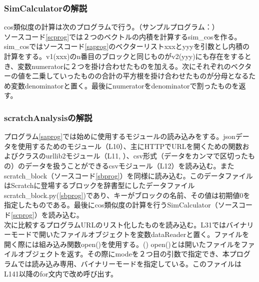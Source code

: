 \documentclass[a4paper,10pt,onecolumn,oneside,openany]{jsbook}
\begin{document}
\subsubsection{SimCalculatorの解説}
cos類似度の計算は次のプログラムで行う。（サンプルプログラム：\cite{simcalc}）
\\
ソースコード\ref{scprog}では２つのベクトルの内積を計算するsim\_cosを作る。
\\
sim\_cosではソースコード\ref{saprog}のベクターリストxxxとyyyを引数とし内積の計算をする。v1(xxx)のn番目のブロックと同じものがv2(yyy)にも存在をするとき、変数numeratorに２つを掛け合わせたものを加える。次にそれぞれのベクターの値を二乗していったものの合計の平方根を掛け合わせたものが分母となるため変数denominatorと置く。最後にnumeratorをdenominatorで割ったものを返す。

\subsubsection{scratchAnalysisの解説}
プログラム\ref{saprog}では始めに使用するモジュールの読み込みをする。jsonデータを使用するためのモジュール（L10）、主にHTTPでURLを開くための関数およびクラスのurllib2モジュール（L11, \cite{urllib}）、csv形式（データをカンマで区切ったもの）のデータを扱うことができるcsvモジュール（L12）を読み込む。またscratch\_block（ソースコード\ref{sbprog}）を同様に読み込む。このデータファイルはScratchに登場するブロックを辞書型にしたデータファイルscratch\_block.py(\ref{sbprog})であり、キーがブロックの名前、その値は初期値0を指定したものである。最後にcos類似度の計算を行うSimCalculator（ソースコード\ref{scprog}）を読み込む。
\\
次に比較するプログラムURLのリスト化したものを読み込む。L31ではバイナリーモードで開いたファイルオブジェクトを変数dataReaderと置く。ファイルを開く際には組み込み関数open()を使用する。(\cite{open}) open()とは開いたファイルをファイルオブジェクトを返す。その際にmodeを２つ目の引数で指定でき、本プログラムでは読み込み専用、バイナリーモードを指定している。このファイルはL141以降のfor文内で改め呼び出す。
\end{document}

